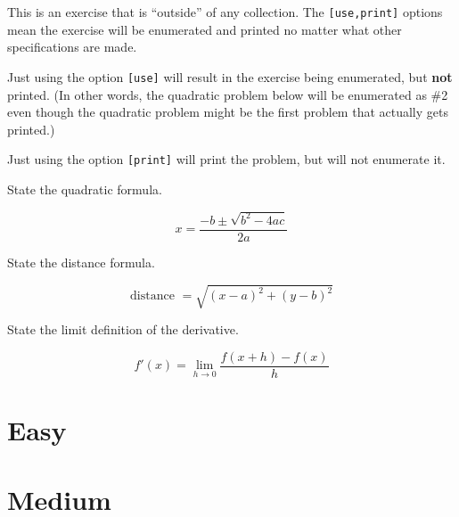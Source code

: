 \documentclass{article}
\begin{document}
\begin{exercise}
  This is an exercise that is ``outside'' of any collection.
  The \texttt{[use,print]} options mean the exercise will be enumerated and printed no matter what other specifications are made.
  
  Just using the option \texttt{[use]} will result in the exercise being enumerated, but \textbf{not} printed.
  (In other words, the quadratic problem below will be enumerated as \#2 even though the quadratic problem might be the first problem that actually gets printed.)
   
  Just using the option \texttt{[print]} will print the problem, but will not
  enumerate it.
\end{exercise}



\begin{exercise}[difficulty=easy,points=1]
  State the quadratic formula.
\end{exercise}
\begin{solution}
  \[ x=\frac{-b\pm\sqrt{b^2-4ac}}{2a} \]
\end{solution}

\begin{exercise}[difficulty=medium,points=1]
  State the distance formula.
\end{exercise}
\begin{solution}
  \[ \text{distance }=\sqrt{(x-a)^2+(y-b)^2} \]
\end{solution}


\begin{exercise}[difficulty=easy,points=1]
  State the limit definition of the derivative.
\end{exercise}
\begin{solution}
  \[ f'(x)=\lim_{h\to 0}\frac{f(x+h)-f(x)}{h} \]
\end{solution}




\section{Easy}

\section{Medium}

\printsolutions[difficulty=medium]
\end{document}
